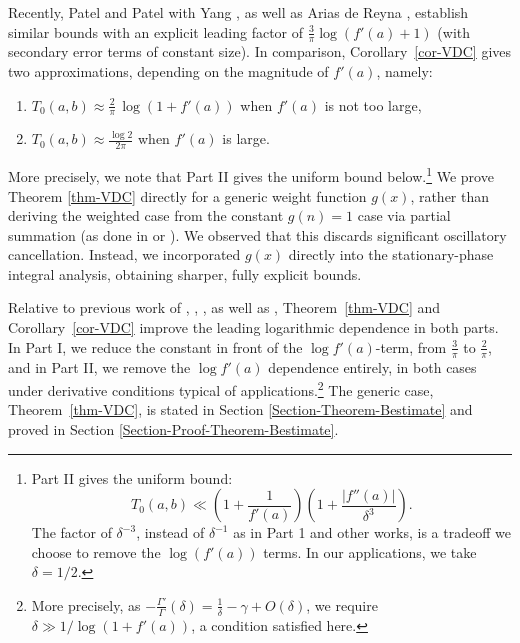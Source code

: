 \documentclass[11pt,letterpaper,oneside,reqno]{amsart}
\renewcommand{\^}[1]{\widehat{#1}}
\numberwithin{equation}{section}
\theoremstyle{remark}
\newcommand*{\thmref}[1]{Theorem~\ref{#1}}
\newcommand*{\corref}[1]{Corollary~\ref{#1}}
\begin{document}
Recently, Patel \cite[Lemma 2.26]{PatelPHD} and Patel with Yang \cite[Lemma 2.1]{PatelYang2024}, as well as Arias de Reyna \cite[Lemma 4]{dereyna2024approximationzetafunctiondirichlet}, establish similar bounds %
with an explicit leading factor of $\displaystyle \frac{3}{\pi} \log(f'(a)+1)$ (with secondary error terms of constant size). 
In comparison, \corref{cor-VDC} gives two approximations, depending on the magnitude of $f'(a)$, namely:
\begin{enumerate}
\item[Part I.\ ] $\displaystyle T_0(a,b) \approx \frac{ 2 }{\pi}\,\log(1+f'(a)) $ when $f'(a)$ is not too large,
\item[Part II.] $\displaystyle T_0(a,b) \approx\frac{\log 2 }{2\pi}$ when $f'(a)$ is large. 
\end{enumerate}
More precisely, we note that Part II gives the uniform bound below.\footnote{Part II gives the uniform bound:
\[
T_0(a,b) \ll \left(1+\frac{1}{f'(a)}\right) \left(1+\frac{|f''(a)|}{\delta^3}\right).
\] 
The factor of ${\delta^{-3}}$, instead of ${\delta^{-1}}$ as in Part 1 and other works, is a tradeoff we choose to remove the $\log(f'(a))$ terms. In our applications, we take $\delta=1/2$. 
}
We prove Theorem \ref{thm-VDC} directly for a generic weight function $g(x)$, rather than deriving the weighted case from the constant $g(n)=1$ case via partial summation (as done in \cite[Lemma 4.10]{Titchmarsh} or \cite[Lemma 5]{dereyna2024approximationzetafunctiondirichlet}). We observed that this discards significant oscillatory cancellation. Instead, we incorporated $g(x)$ directly into the stationary-phase integral analysis, obtaining sharper, fully explicit bounds.
\smallskip

Relative to previous work of \cite[Lemma 6-7]{Karatsuba-Korolev-2007}, \cite[Lemma 2.26]{PatelPHD}, \cite[Lemma 2.1]{PatelYang2024}, as well as \cite[Lemma 4-5]{dereyna2024approximationzetafunctiondirichlet}, \thmref{thm-VDC} and \corref{cor-VDC} improve the leading logarithmic dependence in both parts. In Part I, we reduce the constant in front of the $\log f'(a)$-term, from $\frac{3}{\pi}$ to $\frac{2}{\pi}$, and in Part II, we remove the $\log f'(a)$ dependence entirely, in both cases under derivative conditions typical of applications.\footnote{More precisely, as $-\frac{\Gamma'}{\Gamma}(\delta) = \frac{1}{\delta} - \gamma + O(\delta)$, we require $\delta \gg 1/\log(1+f'(a))$, a condition satisfied here.} 
The generic case, \thmref{thm-VDC}, is stated in Section \ref{Section-Theorem-Bestimate} and proved in Section \ref{Section-Proof-Theorem-Bestimate}.
\smallskip
\end{document}
